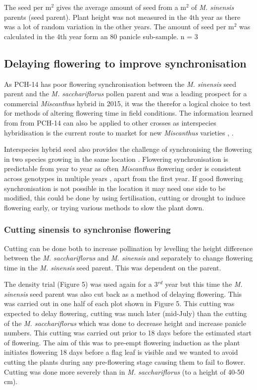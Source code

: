 \documentclass[fleqn, 15pt, lineno]{olplainarticle}
\begin{document}
The seed per m$^2$ gives the average amount of seed from a m$^2$ of \textit{M. sinensis} parents (seed parent).
Plant height was not measured in the 4th year as there was a lot of random variation in the other years.
The amount of seed per m$^2$ was calculated in the 4th year form an 80 panicle sub-sample.
n = 3


\FloatBarrier
\subsection{Delaying flowering to improve synchronisation}
As PCH-14 has poor flowering synchronisation between the \textit{M. sinensis} seed parent and the \textit{M. sacchariflorus} pollen parent and was a leading prospect for a commercial \textit{Miscanthus} hybrid in 2015, it was the therefor a logical choice to test for methods of altering flowering time in field conditions.
The information learned from from PCH-14  can also be applied to other crosses as interspecies hybridisation is the current route to market for new \textit{Miscanthus} varieties \citep{Clifton-Brown2019_progress}, \citep{Clifton-Brown2016_progress}.

Interspecies hybrid seed also provides the challenge of synchronising the flowering in two species growing in the same location \citep{Xue2015}.
Flowering synchronisation is predictable from year to year as often \textit{Miscanthus} flowering order is consistent across genotypes in multiple years \citep{Jensen2011}, apart from the first year.
If good flowering synchronisation is not possible in the location it may need one side to be modified, this could be done by using fertilisation, cutting or drought to induce flowering early, or trying various methods to slow the plant down.



\FloatBarrier
\subsubsection{Cutting sinensis to synchronise flowering}
Cutting can be done both to increase pollination by levelling the height difference between the \textit{M. sacchariflorus} and \textit{M. sinensis} and separately to change flowering time in the \textit{M. sinensis} seed parent.
This was dependent on the parent.

The density trial (Figure 5) was used again for a 3$^{rd}$ year but this time the \textit{M. sinensis} seed parent was also cut back as a method of delaying flowering.
This was carried out in one half of each plot shown in Figure 5.
This cutting was expected to delay flowering, cutting was much later (mid-July) than the cutting of the \textit{M. sacchariflorus} which was done to decrease height and increase panicle numbers.
This cutting was carried out prior to 18 days before the estimated start of flowering.
The aim of this was to pre-empt flowering induction as the plant initiates flowering 18 days before a flag leaf is visible \citep{Jensen2013} and we wanted to avoid cutting the plants during any pre-flowering stage causing them to fail to flower.
Cutting was done more severely than in \textit{M. sacchariflorus} (to a height of 40-50 cm).
\end{document}
